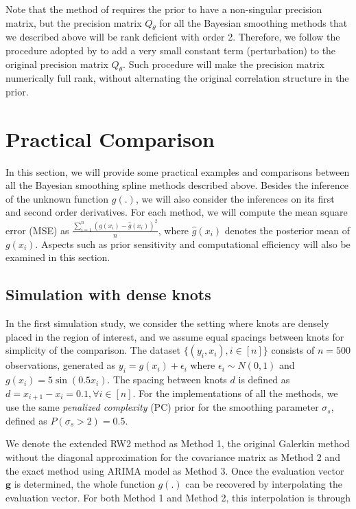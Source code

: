 \documentclass{article}
\begin{document}
Note that the method of \cite{tierney1986accurate} requires the prior to have a non-singular precision matrix, but the precision matrix $Q_\theta$ for all the Bayesian smoothing methods that we described above will be rank deficient with order 2. Therefore, we follow the procedure adopted by \cite{wood2011fast} to add a very small constant term (perturbation) to the original precision matrix $Q_\theta$. Such procedure will make the precision matrix numerically full rank, without alternating the original correlation structure in the prior.

\section{Practical Comparison}\label{practice}

In this section, we will provide some practical examples and comparisons between all the Bayesian smoothing spline methods described above. Besides the inference of the unknown function $g(.)$, we will also consider the inferences on its first and second order derivatives. For each method, we will compute the mean square error (MSE) as $\frac{\sum_{i=1}^n (g(x_i) - \hat{g}(x_i))^2}{n}$, where $\hat{g}(x_i)$ denotes the posterior mean of $g(x_i)$. Aspects such as prior sensitivity and computational efficiency will also be  examined in this section.

\subsection{Simulation with dense knots}

In the first simulation study, we consider the setting where knots are densely placed in the region of interest, and we assume equal spacings between knots for simplicity of the comparison. The dataset $\{(y_i,x_i), i \in [n]\}$ consists of $n = 500$ observations, generated as $y_i = g(x_i) + \epsilon_i$ where $\epsilon_i \sim N(0,1)$ and $g(x_i) = 5 \sin (0.5 x_i)$. The spacing between knots $d$ is defined as $d = x_{i+1} - x_i = 0.1, \forall i \in [n]$. For the implementations of all the methods, we use the same \textit{penalized complexity} (PC) prior \citep{simpson2017penalising} for the smoothing parameter $\sigma_s$, defined as $P(\sigma_s > 2) = 0.5$. 

We denote the extended RW2 method as Method 1, the original Galerkin method without the diagonal approximation for the covariance matrix as Method 2 and the exact method using ARIMA model as Method 3. Once the evaluation vector $\boldsymbol{g}$ is determined, the whole function $g(.)$ can be recovered by interpolating the evaluation vector. For both Method 1 and Method 2, this interpolation is through 
\end{document}
